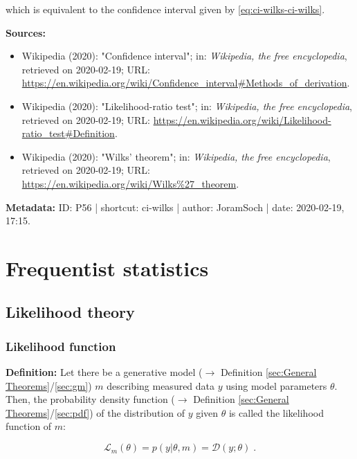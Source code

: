 \documentclass[a4paper,12pt,twoside]{book}
\begin{document}
which is equivalent to the confidence interval given by \eqref{eq:ci-wilks-ci-wilks}.


\vspace{1em}
\textbf{Sources:}
\begin{itemize}
\item Wikipedia (2020): "Confidence interval"; in: \textit{Wikipedia, the free encyclopedia}, retrieved on 2020-02-19; URL: \url{https://en.wikipedia.org/wiki/Confidence_interval#Methods_of_derivation}.
\item Wikipedia (2020): "Likelihood-ratio test"; in: \textit{Wikipedia, the free encyclopedia}, retrieved on 2020-02-19; URL: \url{https://en.wikipedia.org/wiki/Likelihood-ratio_test#Definition}.
\item Wikipedia (2020): "Wilks' theorem"; in: \textit{Wikipedia, the free encyclopedia}, retrieved on 2020-02-19; URL: \url{https://en.wikipedia.org/wiki/Wilks%27_theorem}.
\end{itemize}


\vspace{1em}
\textbf{Metadata:} ID: P56 | shortcut: ci-wilks | author: JoramSoch | date: 2020-02-19, 17:15.
\vspace{1em}



\pagebreak
\section{Frequentist statistics}

\subsection{Likelihood theory}

\subsubsection[\textit{Likelihood function}]{Likelihood function} \label{sec:lf}
\setcounter{equation}{0}

\textbf{Definition:} Let there be a generative model ($\rightarrow$ Definition \ref{sec:General Theorems}/\ref{sec:gm}) $m$ describing measured data $y$ using model parameters $\theta$. Then, the probability density function ($\rightarrow$ Definition \ref{sec:General Theorems}/\ref{sec:pdf}) of the distribution of $y$ given $\theta$ is called the likelihood function of $m$:

\begin{equation} \label{eq:lf-lf}
\mathcal{L}_m(\theta) = p(y|\theta,m) = \mathcal{D}(y; \theta) \; .
\end{equation}
\end{document}

